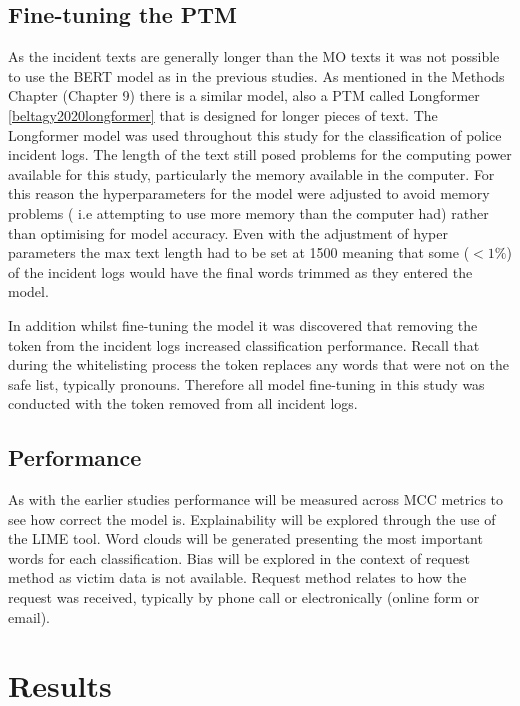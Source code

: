 \subsection{Fine-tuning the PTM} As the incident texts are generally longer than the MO texts it was not possible to use the BERT model as in the previous studies. As mentioned in the Methods Chapter (Chapter 9) there is a similar model, also a PTM called Longformer \ref{beltagy2020longformer}  that is designed for longer pieces of text. The Longformer model was used throughout this study for the classification of police incident logs. The length of the text still posed problems for the computing power available for this study, particularly the memory available in the computer. For this reason the hyperparameters for the model were adjusted to avoid memory problems ( i.e attempting to use more memory than the computer had) rather than optimising for model accuracy. Even with the adjustment of hyper parameters the max text length had to be set at 1500 meaning that some ($<1\%$) of the incident logs would have the final words trimmed as they entered the model.

In addition whilst fine-tuning the model it was discovered that removing the  token from the incident logs increased classification performance. Recall that during the whitelisting process the  token replaces any words that were not on the safe list, typically pronouns. Therefore all model fine-tuning in this study was conducted with the  token removed from all incident logs. 

\subsection{Performance} As with the earlier studies performance will be measured across MCC metrics to see how correct the model is. Explainability will be explored through the use of the LIME tool.  Word clouds will be generated presenting the most important words for each classification. Bias will be explored in the context of request method as victim data is not available. Request method relates to how the request was received, typically by phone call or electronically (online form or email).

 

\section{Results}

